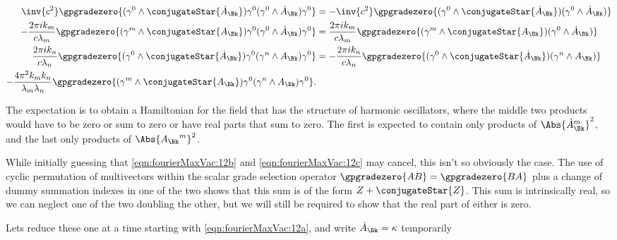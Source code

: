 \begin{subequations}
\label{eqn:fourierMaxVac:12}
\begin{align}
\inv{c^2}
\gpgradezero{ (\gamma^0 \wedge \conjugateStar{\dot{A}_{\Bk}} ) \gamma^0 (\gamma^0 \wedge \dot{A}_\Bk) \gamma^0 } &=
-\inv{c^2}
\gpgradezero{ (\gamma^0 \wedge \conjugateStar{\dot{A}_{\Bk}} ) (\gamma^0 \wedge \dot{A}_\Bk) } 
\label{eqn:fourierMaxVac:12a}
\\
- \frac{2 \pi i k_m}{c \lambda_m} 
\gpgradezero{ 
(\gamma^m \wedge \conjugateStar{A_{\Bk}} ) \gamma^0 ( \gamma^0 \wedge \dot{A}_\Bk ) \gamma^0
} 
&=
\frac{2 \pi i k_m}{c \lambda_m} 
\gpgradezero{ 
(\gamma^m \wedge \conjugateStar{A_{\Bk}} ) ( \gamma^0 \wedge \dot{A}_\Bk ) 
} 
\label{eqn:fourierMaxVac:12b}
\\
\frac{2 \pi i k_n}{c \lambda_n} 
\gpgradezero{ 
( \gamma^0 \wedge \conjugateStar{\dot{A}_{\Bk}} ) \gamma^0 ( \gamma^n \wedge A_\Bk ) \gamma^0
} 
&=
-\frac{2 \pi i k_n}{c \lambda_n} 
\gpgradezero{ 
( \gamma^0 \wedge \conjugateStar{\dot{A}_{\Bk}} ) ( \gamma^n \wedge A_\Bk ) 
} 
\label{eqn:fourierMaxVac:12c}
\\
-\frac{4 \pi^2 k_m k_n}{\lambda_m \lambda_n}
\gpgradezero{ 
(\gamma^m \wedge \conjugateStar{A_{\Bk}} ) \gamma^0
(\gamma^n \wedge A_\Bk ) \gamma^0
}. &
\label{eqn:fourierMaxVac:12d}
\end{align}
\end{subequations}

The expectation is to obtain a Hamiltonian for the field that has the structure of harmonic oscillators, where the middle two products would have to be zero or sum to zero or have real parts that sum to zero.  The first is expected to contain only products of $\Abs{{\dot{A}_\Bk}^m}^2$, and the last only products of $\Abs{{A_\Bk}^m}^2$.

While initially guessing that \ref{eqn:fourierMaxVac:12b} and \ref{eqn:fourierMaxVac:12c} may cancel, this isn't so obviously the case.  The use of cyclic permutation of multivectors within the scalar grade selection operator $\gpgradezero{A B} = \gpgradezero{B A}$ plus a change of dummy summation indexes in one of the two shows that this sum is of the form $Z + \conjugateStar{Z}$.  This sum is intrinsically real, so we can neglect one of the two doubling the other, but we will still be required to show that the real part of either is zero.

Lets reduce these one at a time starting with \ref{eqn:fourierMaxVac:12a}, and write $\dot{A}_\Bk = \kappa$ temporarily

